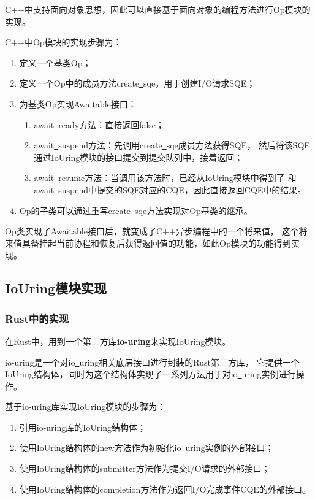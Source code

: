 \documentclass[supercite]{HustGraduPaper}
\theoremstyle{definition}
\begin{document}
C++中支持面向对象思想，因此可以直接基于面向对象的编程方法进行Op模块的实现。\par

C++中Op模块的实现步骤为：

\begin{enumerate}[label={(\arabic*)}]
  \item 定义一个基类Op；
  \item 定义一个Op中的成员方法create\underline{~}sqe，用于创建I/O请求SQE；
  \item 为基类Op实现Awaitable接口：
    \begin{enumerate}
      \item await\underline{~}ready方法：直接返回false；
      \item await\underline{~}suspend方法：先调用create\underline{~}sqe成员方法获得SQE，
        然后将该SQE通过IoUring模块的接口提交到提交队列中，接着返回；
      \item await\underline{~}resume方法：当调用该方法时，已经从IoUring模块中得到了
        和await\underline{~}suspend中提交的SQE对应的CQE，因此直接返回CQE中的结果。
    \end{enumerate}
  \item Op的子类可以通过重写create\underline{~}sqe方法实现对Op基类的继承。
\end{enumerate}

Op类实现了Awaitable接口后，就变成了C++异步编程中的一个将来值，
这个将来值具备挂起当前协程和恢复后获得返回值的功能，如此Op模块的功能得到实现。\par

\subsection{IoUring模块实现}

\subsubsection{Rust中的实现}

在Rust中，用到一个第三方库\textbf{io-uring}\cite{io-uring.org}来实现IoUring模块。\par

io-uring是一个对io\underline{~}uring相关底层接口进行封装的Rust第三方库，
它提供一个IoUring结构体，同时为这个结构体实现了一系列方法用于对io\underline{~}uring实例进行操作。\par

基于io-uring库实现IoUring模块的步骤为：

\begin{enumerate}[label={(\arabic*)}]
  \item 引用io-uring库的IoUring结构体；
  \item 使用IoUring结构体的new方法作为初始化io\underline{~}uring实例的外部接口；
  \item 使用IoUring结构体的submitter方法作为提交I/O请求的外部接口；
  \item 使用IoUring结构体的completion方法作为返回I/O完成事件CQE的外部接口。
\end{enumerate}
\end{document}
